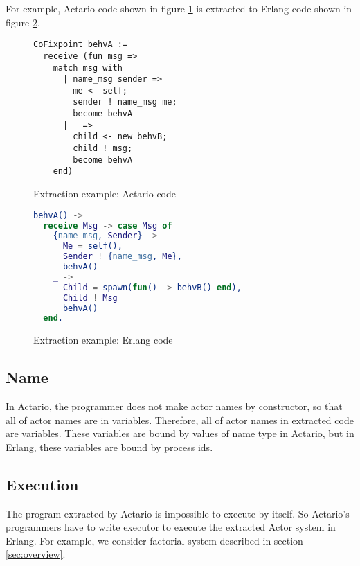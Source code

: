 For example, Actario code shown in figure \ref{coq:extractionex} is extracted to Erlang code shown in figure \ref{erl:extractionex}.

\begin{figure}[t]
  \begin{lstlisting}
CoFixpoint behvA :=
  receive (fun msg =>
    match msg with
      | name_msg sender =>
        me <- self;
        sender ! name_msg me;
        become behvA
      | _ =>
        child <- new behvB;
        child ! msg;
        become behvA
    end)
  \end{lstlisting}
  \caption{Extraction example: Actario code}\label{coq:extractionex}
\end{figure}

\begin{figure}[t]
  \begin{lstlisting}[language=erlang]
behvA() ->
  receive Msg -> case Msg of
    {name_msg, Sender} ->
      Me = self(),
      Sender ! {name_msg, Me},
      behvA()
    _ ->
      Child = spawn(fun() -> behvB() end),
      Child ! Msg
      behvA()
  end.
  \end{lstlisting}
  \caption{Extraction example: Erlang code}\label{erl:extractionex}
\end{figure}

\subsection{Name}
In Actario, the programmer does not make actor names by constructor, so that all of actor names are in variables.
Therefore, all of actor names in extracted code are variables.
These variables are bound by values of name type in Actario, but in Erlang, these variables are bound by process ids.

\subsection{Execution}
The program extracted by Actario is impossible to execute by itself.
So Actario's programmers have to write executor to execute the extracted Actor system in Erlang.
For example, we consider factorial system described in section \ref{sec:overview}.


